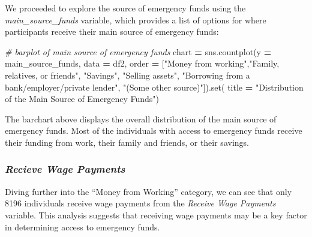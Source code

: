 \documentclass[water,article,submit,moreauthors,pdftex]{mdpi}
\newenvironment{Shaded}{\begin{snugshade}}{\end{snugshade}}
\newcommand{\BuiltInTok}[1]{#1}
\newcommand{\CommentTok}[1]{\textcolor[rgb]{0.56,0.35,0.01}{\textit{#1}}}
\newcommand{\NormalTok}[1]{#1}
\newcommand{\OperatorTok}[1]{\textcolor[rgb]{0.81,0.36,0.00}{\textbf{#1}}}
\newcommand{\StringTok}[1]{\textcolor[rgb]{0.31,0.60,0.02}{#1}}
\begin{document}
We proceeded to explore the source of emergency funds using the
\emph{main\_source\_funds} variable, which provides a list of options
for where participants receive their main source of emergency funds:

\begin{Shaded}
\begin{Highlighting}[]
\CommentTok{\# barplot of main source of emergency funds}
\NormalTok{chart }\OperatorTok{=}\NormalTok{ sns.countplot(y }\OperatorTok{=} \StringTok{\textquotesingle{}main\_source\_funds\textquotesingle{}}\NormalTok{, }
\NormalTok{                      data }\OperatorTok{=}\NormalTok{ df2, }
\NormalTok{                      order }\OperatorTok{=}\NormalTok{ [}\StringTok{"Money from working"}\NormalTok{,}\StringTok{"Family, relatives, or friends"}\NormalTok{,}
                               \StringTok{"Savings"}\NormalTok{, }\StringTok{"Selling assets"}\NormalTok{,}
                               \StringTok{"Borrowing from a bank/employer/private lender"}\NormalTok{, }\StringTok{"(Some other source)"}\NormalTok{]).}\BuiltInTok{set}\NormalTok{(}
\NormalTok{                      title }\OperatorTok{=} \StringTok{"Distribution of the Main Source of Emergency Funds"}\NormalTok{)}
\end{Highlighting}
\end{Shaded}

The barchart above displays the overall distribution of the main source
of emergency funds. Most of the individuals with access to emergency
funds receive their funding from work, their family and friends, or
their savings.

\hypertarget{recieve-wage-payments}{%
\subsubsection{\texorpdfstring{\emph{Recieve Wage
Payments}}{Recieve Wage Payments}}\label{recieve-wage-payments}}

Diving further into the ``Money from Working'' category, we can see that
only 8196 individuals receive wage payments from the \emph{Receive Wage
Payments} variable. This analysis suggests that receiving wage payments
may be a key factor in determining access to emergency funds.
\end{document}
